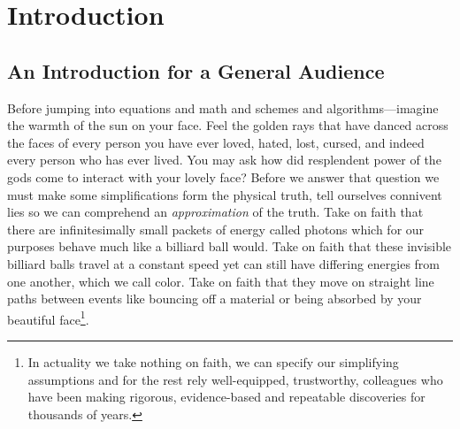
\chapter{Introduction}
\label{chap:intro}


\section{An Introduction for a General Audience}

Before jumping into equations and math and schemes and algorithms---imagine the warmth of the sun on your face.
Feel the golden rays that have danced across the faces of every person you have ever loved, hated, lost, cursed, and indeed every person who has ever lived.
You may ask how did resplendent power of the gods come to interact with your lovely face?
Before we answer that question we must make some simplifications form the physical truth, tell ourselves connivent lies so we can comprehend an \textit{approximation} of the truth.
Take on faith that there are infinitesimally small packets of energy called photons which for our purposes behave much like a billiard ball would.
Take on faith that these invisible billiard balls travel at a constant speed yet can still have differing energies from one another, which we call color.
Take on faith that they move on straight line paths between events like bouncing off a material or being absorbed by your beautiful face\footnote{In actuality we take nothing on faith, we can specify our simplifying assumptions and for the rest rely well-equipped, trustworthy, colleagues who have been making rigorous, evidence-based and repeatable discoveries for thousands of years.}.

